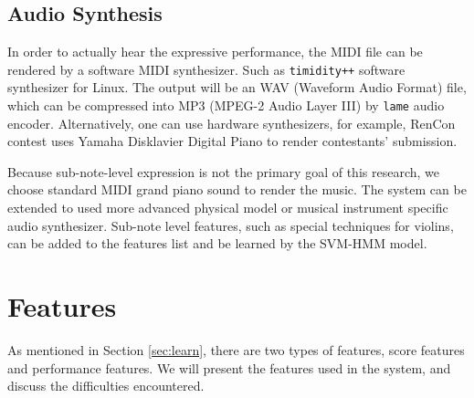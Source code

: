 \subsection{Audio Synthesis}
In order to actually hear the expressive performance, the MIDI file can be rendered by a software MIDI synthesizer. %
Such as \texttt{timidity++} software synthesizer for Linux. The output will be an WAV (Waveform Audio Format) file, which can be compressed into MP3 (MPEG-2 Audio Layer III) by \texttt{lame} audio encoder. Alternatively, one can use hardware synthesizers, for example, RenCon\cite{RenCon} contest uses Yamaha Disklavier Digital Piano to render contestants' submission.

Because sub-note-level expression is not the primary goal of this research, we choose standard MIDI grand piano sound to render the music. The system can be extended to used more advanced physical model or musical instrument specific audio synthesizer. Sub-note level features, such as special techniques for violins, can be added to the features list and be learned by the SVM-HMM model.
   
\section{Features}
   As mentioned in Section \ref{sec:learn}, there are two types of features, score features and performance features. We will present the features used in the system, and discuss the difficulties encountered.
